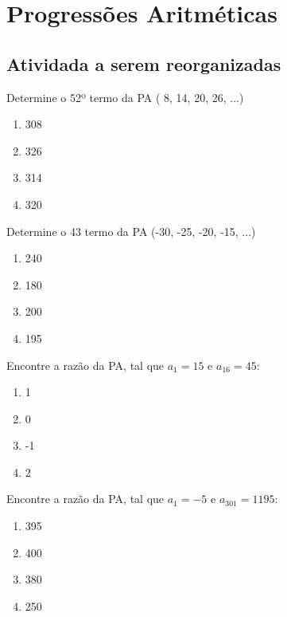 \chapter{Progressões Aritméticas}
	\section{Atividada a serem reorganizadas}
	
		\item Determine o 52º termo da PA ( 8, 14, 20, 26, ...) 
		\begin{multicols}{4}
		\begin{enumerate}
			\item 308
			\item 326
			\item 314
			\item 320
		\end{enumerate} 
		\end{multicols}

		\item Determine o 43 termo da PA (-30, -25, -20, -15, ...) 
		\begin{multicols}{4}
		\begin{enumerate}
			\item 240
			\item 180
			\item 200
			\item 195
		\end{enumerate} 
		\end{multicols}

		\item Encontre a razão da PA, tal que $a_{1} = 15$ e $a_{16} = 45$:
		 \begin{multicols}{4}
		\begin{enumerate}
			\item 1
			\item 0
			\item -1 
			\item 2 
		\end{enumerate} 
		\end{multicols}
		
		\item Encontre a razão da PA, tal que $a_{1} = -5$ e $a_{301} = 1195$: 
		\begin{multicols}{4}
		\begin{enumerate}
			\item 395
			\item 400
			\item 380 
			\item  250
		\end{enumerate} 
		\end{multicols}
		

